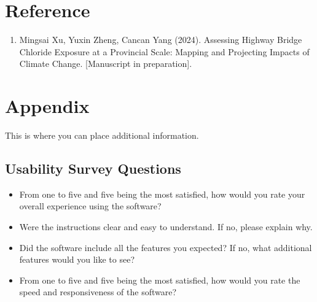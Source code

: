 \documentclass[12pt, titlepage]{article}
\newcounter{refnum} %
\begin{document}
				
%

%

\section*{Reference}
\begin{enumerate}
\item {} \label{ref1}
Mingsai Xu, Yuxin Zheng, Cancan Yang (2024). Assessing Highway Bridge Chloride Exposure at a Provincial Scale: Mapping and Projecting Impacts of Climate Change.  [Manuscript in preparation].

\end{enumerate}


\newpage

\section{Appendix}

This is where you can place additional information.

\subsection{Usability Survey Questions}\label{USQ}
\begin{itemize}
\item From one to five and five being the most satisfied, how would you rate your overall experience using the software?
\item Were the instructions clear and easy to understand. If no, please explain why.
\item Did the software include all the features you expected? If no, what additional features would you like to see?
\item From one to five and five being the most satisfied, how would you rate the speed and responsiveness of the software?
\end{itemize}
\end{document}
